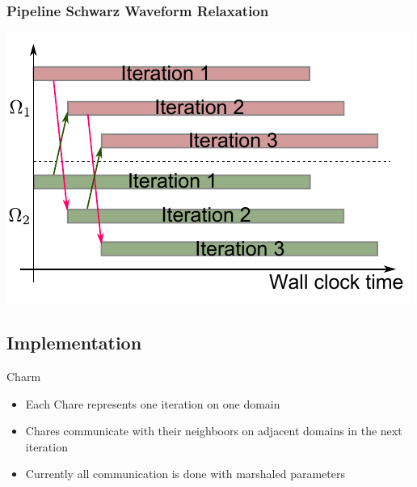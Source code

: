 \documentclass[]{beamer}
\begin{document}
\begin{frame}
  \frametitle{Pipeline Schwarz Waveform Relaxation}
  \centering
  \includegraphics[height=0.7\textheight]{figures/pswr}
\end{frame}







\subsection{Implementation}

\begin{frame}{Charm}

  \begin{itemize}
  \item Each Chare represents one iteration on one domain
  \item Chares communicate with their neighboors on adjacent domains
    in the next iteration
  \item Currently all communication is done with marshaled parameters
  \end{itemize}

\end{frame}
\end{document}
